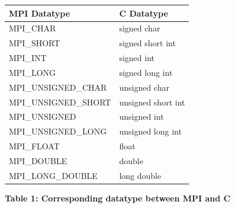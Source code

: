 \documentclass[letterpaper,10pt,openany,oneside]{sphinxmanual}
\begin{document}
\begin{tabulary}{\linewidth}{|L|L|}
\hline
\textbf{
MPI Datatype
} & \textbf{
C Datatype
}\\\hline

MPI\_CHAR
 & 
signed char
\\\hline

MPI\_SHORT
 & 
signed short int
\\\hline

MPI\_INT
 & 
signed int
\\\hline

MPI\_LONG
 & 
signed long int
\\\hline

MPI\_UNSIGNED\_CHAR
 & 
unsigned char
\\\hline

MPI\_UNSIGNED\_SHORT
 & 
unsigned short int
\\\hline

MPI\_UNSIGNED
 & 
unsigned int
\\\hline

MPI\_UNSIGNED\_LONG
 & 
unsigned long int
\\\hline

MPI\_FLOAT
 & 
float
\\\hline

MPI\_DOUBLE
 & 
double
\\\hline

MPI\_LONG\_DOUBLE
 & 
long double
\\\hline
\end{tabulary}


\textbf{Table 1: Corresponding datatype between MPI and C}
\end{document}
